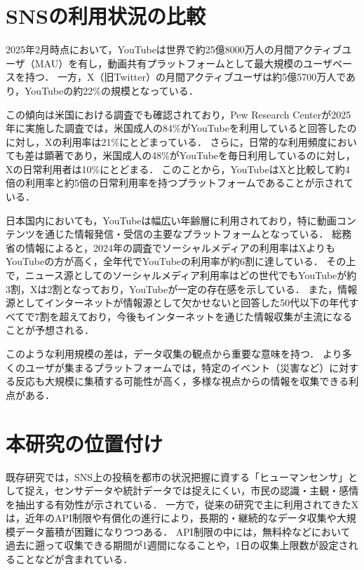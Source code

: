 \section{SNSの利用状況の比較}
2025年2月時点において，YouTubeは世界で約25億8000万人の月間アクティブユーザ（MAU）を有し，動画共有プラットフォームとして最大規模のユーザベースを持つ\cite{statista2025_social_networks}．
一方，X（旧Twitter）の月間アクティブユーザは約5億5700万人であり，YouTubeの約22\%の規模となっている．

この傾向は米国における調査でも確認されており，Pew Research Centerが2025年に実施した調査では，米国成人の84\%がYouTubeを利用していると回答したのに対し，Xの利用率は21\%にとどまっている\cite{pewresearch2025_social_media}．
さらに，日常的な利用頻度においても差は顕著であり，米国成人の48\%がYouTubeを毎日利用しているのに対し，Xの日常利用者は10\%にとどまる．
このことから，YouTubeはXと比較して約4倍の利用率と約5倍の日常利用率を持つプラットフォームであることが示されている．

日本国内においても，YouTubeは幅広い年齢層に利用されており，特に動画コンテンツを通じた情報発信・受信の主要なプラットフォームとなっている\cite{soumu2024_ict}．
総務省の情報によると，2024年の調査でソーシャルメディアの利用率はXよりもYouTubeの方が高く，全年代でYouTubeの利用率が約6割に達している．
その上で，ニュース源としてのソーシャルメディア利用率はどの世代でもYouTubeが約3割，Xは2割となっており，YouTubeが一定の存在感を示している．
また，情報源としてインターネットが情報源として欠かせないと回答した50代以下の年代すべてで7割を超えており，今後もインターネットを通じた情報収集が主流になることが予想される．

このような利用規模の差は，データ収集の観点から重要な意味を持つ．
より多くのユーザが集まるプラットフォームでは，特定のイベント（災害など）に対する反応も大規模に集積する可能性が高く，多様な視点からの情報を収集できる利点がある．

\section{本研究の位置付け}

既存研究では，SNS上の投稿を都市の状況把握に資する「ヒューマンセンサ」として捉え，センサデータや統計データでは捉えにくい，市民の認識・主観・感情を抽出する有効性が示されている．
一方で，従来の研究で主に利用されてきたXは，近年のAPI制限や有償化の進行により，長期的・継続的なデータ収集や大規模データ蓄積が困難になりつつある．
API制限の中には，無料枠などにおいて過去に遡って収集できる期間が1週間になることや，1日の収集上限数が設定されることなどが含まれている．

